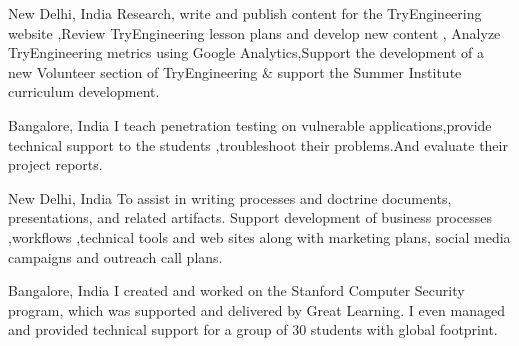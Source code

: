 \documentclass[10pt,a4paper,ragged2e]{altacv}
\begin{document}

\begin{fullwidth}
\makecvheader
\end{fullwidth}

     {New Delhi, India}
Research, write  and  publish content  for the TryEngineering website ,Review TryEngineering lesson  plans  and develop  new content , Analyze TryEngineering metrics  using  Google  Analytics,Support the  development of a  new Volunteer  section of  TryEngineering & support the Summer Institute curriculum  development.

\divider

     {Bangalore, India}
I teach penetration testing on vulnerable applications,provide technical support to the students ,troubleshoot their problems.And evaluate their project reports.

\divider

     {New Delhi, India}
To assist in writing processes and doctrine documents, presentations, and related artifacts. Support development of business processes ,workflows ,technical tools and web sites along with marketing plans, social media campaigns and outreach call plans.

\divider

  {Bangalore, India}
I created  and  worked  on  the  Stanford  Computer  Security program, which was supported and delivered by Great Learning. I even managed and provided technical support for a group of 30 students with global footprint.
\end{document}
